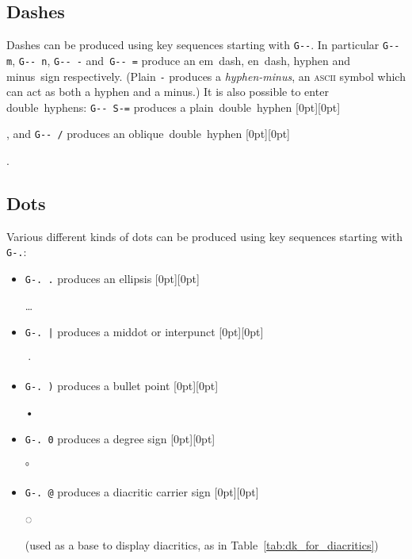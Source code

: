 \documentclass[oneside]{memoir}
\newcommand{\key}{\verb}
\newcommand{\out}[1]{\raisebox{0pt}[0pt][0pt]{\setlength{\fboxsep}{1pt}\colorbox{gray!20}{\strut{}#1}}}
\begin{document}
{{{\subsection{Dashes}
\label{sec:dashes}

Dashes can be produced using key sequences starting with \key|G--|.
In particular \key|G-- m|, \key|G-- n|, \key|G-- -| and~\key|G-- =|
  produce an em~dash, en~dash, hyphen and minus~sign respectively.
(Plain \key|-| produces a \textit{hyphen-minus},
  an \textsc{ascii} symbol which can act as both a hyphen and a minus.)
It is also possible to enter double~hyphens:
  \key|G-- S-=| produces a plain~double~hyphen \out{}, and \key|G-- /| produces an oblique~double~hyphen \out{}.

\subsection{Dots}
\label{sec:dots}

Various different kinds of dots can be produced using key sequences starting with \key|G-.|:

\begin{itemize}[noitemsep]
\item \key|G-. .| produces an ellipsis \out{…}
\item \key!G-. |! produces a middot or interpunct \out{·}
\item \key|G-. )| produces a bullet point \out{•}
\item \key|G-. 0| produces a degree sign \out{°}
\item \key|G-. @| produces a diacritic carrier sign \out{◌}
  (used as a base to display diacritics, as in Table~\ref{tab:dk_for_diacritics})
\end{itemize}

}}}
\end{document}
